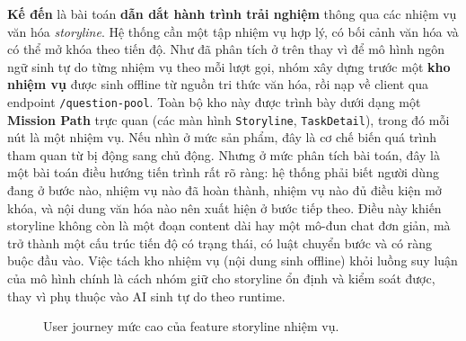 \textbf{Kế đến} là bài toán \textbf{dẫn dắt hành trình trải nghiệm}
thông qua các nhiệm vụ văn hóa \textit{storyline}. Hệ thống cần một tập
nhiệm vụ hợp lý, có bối cảnh văn hóa và có thể mở khóa theo tiến độ.
Như đã phân tích ở trên thay vì để mô hình ngôn ngữ sinh tự do từng nhiệm vụ theo mỗi lượt gọi,
nhóm xây dựng trước một \textbf{kho nhiệm vụ}
được sinh offline từ nguồn tri thức văn hóa, rồi nạp về client qua
endpoint \texttt{/question-pool}. Toàn bộ kho này được trình bày dưới
dạng một \textbf{Mission Path} trực quan (các màn hình \texttt{Storyline},
\texttt{TaskDetail}), trong đó mỗi nút là một nhiệm vụ. Nếu nhìn ở mức
sản phẩm, đây là cơ chế biến quá trình tham quan từ bị động sang chủ
động. Nhưng ở mức phân tích bài toán, đây là một bài toán điều hướng
tiến trình rất rõ ràng: hệ thống phải biết người dùng đang ở bước nào,
nhiệm vụ nào đã hoàn thành, nhiệm vụ nào đủ điều kiện mở khóa, và nội
dung văn hóa nào nên xuất hiện ở bước tiếp theo. Điều này khiến storyline
không còn là một đoạn content dài hay một mô-đun chat đơn giản, mà trở
thành một cấu trúc tiến độ có trạng thái, có luật chuyển bước và có
ràng buộc đầu vào. Việc tách kho nhiệm vụ (nội dung sinh offline) khỏi
luồng suy luận của mô hình chính là cách nhóm giữ cho storyline ổn
định và kiểm soát được, thay vì phụ thuộc vào AI sinh tự do theo runtime.

\begin{figure}[H]
\centering
{}
\caption{User journey mức cao của feature storyline nhiệm vụ.}
\label{fig:journey_storyline}
\end{figure}

